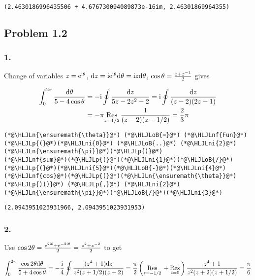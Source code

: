 \documentclass[12pt,landscape]{article}
\newcommand{\HLJLn}[1]{#1}
\newcommand{\HLJLnf}[1]{\textcolor[RGB]{66,102,213}{#1}}
\newcommand{\HLJLni}[1]{\textcolor[RGB]{59,151,46}{#1}}
\newcommand{\HLJLoB}[1]{\textcolor[RGB]{102,102,102}{\textbf{#1}}}
\newcommand{\HLJLp}[1]{#1}
\def\D{ {\rm d} }
\def\I{ {\rm i} }
\def\E{ {\rm e} }
\def\Res_#1{\underset{#1}{\rm Res}\,}
\def\dz{\D z}
\begin{document}
{\begin{lstlisting}
(2.4630186996435506 + 4.676730094089873e-16im, 2.46301869964355)
\end{lstlisting}
\newpage

\subsection{Problem 1.2}
\subsubsection{1.}
Change of variables $z = \E^{\I \theta}$, $\dz = \I \E^{\I \theta} \D\theta = \I z \D\theta$, $\cos \theta = {z + z^{-1} \over 2}$ gives

\begin{align*}
\int_0^{2 \pi} {\D\theta \over 5-4 \cos \theta}  &= - \I \oint {\dz \over 5z - 2z^2 - 2}  = \I \oint {\dz \over (z-2)(2z-1)}\\
& = -\pi \Res_{z=1/2} {1 \over (z-2)(z-1/2)} = {2 \over 3} \pi
\end{align*}

\begin{lstlisting}
(*@\HLJLn{\ensuremath{\theta}}@*) (*@\HLJLoB{=}@*) (*@\HLJLnf{Fun}@*)(*@\HLJLp{(}@*)(*@\HLJLni{0}@*) (*@\HLJLoB{..}@*) (*@\HLJLni{2}@*)(*@\HLJLn{\ensuremath{\pi}}@*)(*@\HLJLp{)}@*)
(*@\HLJLnf{sum}@*)(*@\HLJLp{(}@*)(*@\HLJLni{1}@*)(*@\HLJLoB{/}@*)(*@\HLJLp{(}@*)(*@\HLJLni{5}@*)(*@\HLJLoB{-}@*)(*@\HLJLni{4}@*)(*@\HLJLnf{cos}@*)(*@\HLJLp{(}@*)(*@\HLJLn{\ensuremath{\theta}}@*)(*@\HLJLp{)))}@*) (*@\HLJLp{,}@*) (*@\HLJLni{2}@*)(*@\HLJLn{\ensuremath{\pi}}@*)(*@\HLJLoB{/}@*)(*@\HLJLni{3}@*)
\end{lstlisting}

\begin{lstlisting}
(2.0943951023931966, 2.0943951023931953)
\end{lstlisting}

\newpage
\subsubsection{2.}
Use $\cos 2 \theta = { \E^{2 \I \theta} + \E^{-2 \I \theta} \over 2} = {z^2 + z^{-2} \over 2}$ to get

\[
\int_0^{2 \pi} {\cos 2 \theta \D\theta \over 5+4 \cos \theta}  = - {\I \over 4} \oint { (z^4 + 1)\dz \over z^2 (z+1/2)(z+2)}  = {\pi \over 2} \left( \Res_{z=-1/2} + \Res_{z=0}\right) {z^4+1 \over z^2(z+2)(z+1/2)} = {\pi \over 6}
\]

}
\end{document}
